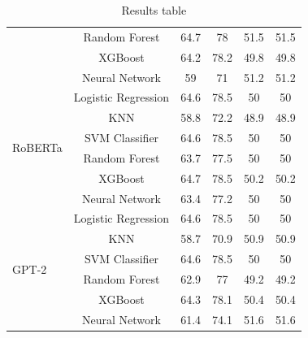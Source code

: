 \begin{table}[htb]
\begin{tabular}{l|c|c|c|c|c}
    & Random Forest &       64.7 &       78   &                51.5 &      51.5 \\
    & XGBoost &       64.2 &       78.2 &                49.8 &      49.8 \\
    & Neural Network &       59   &       71   &                51.2 &      51.2 \\
\hline
\multirow{6}{*}{RoBERTa} 
    & Logistic Regression &       64.6 &       78.5 &                50   &      50   \\
    & KNN &       58.8 &       72.2 &                48.9 &      48.9 \\
    & SVM Classifier &       64.6 &       78.5 &                50   &      50   \\
    & Random Forest &       63.7 &       77.5 &                50   &      50   \\
    & XGBoost &       64.7 &       78.5 &                50.2 &      50.2 \\
    & Neural Network &       63.4 &       77.2 &                50   &      50   \\
\hline
\multirow{6}{*}{GPT-2} 
    & Logistic Regression &       64.6 &       78.5 &                50   &      50   \\
    & KNN &       58.7 &       70.9 &                50.9 &      50.9 \\
    & SVM Classifier &       64.6 &       78.5 &                50   &      50   \\
    & Random Forest &       62.9 &       77   &                49.2 &      49.2 \\
    & XGBoost &       64.3 &       78.1 &                50.4 &      50.4 \\
    & Neural Network &       61.4 &       74.1 &                51.6 &      51.6 \\
\hline
\end{tabular}
\caption{Results table}
\label{results_table}
\end{table}



